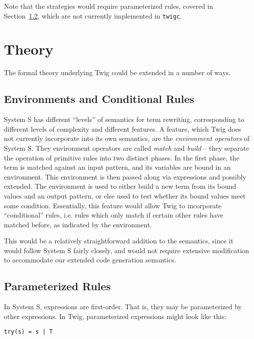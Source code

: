Note that the strategies would require parameterized rules,
covered in Section~\ref{sec:fw:param-rules}, which are not
currently implemented in \texttt{twigc}.

\section{Theory}

The formal theory underlying Twig could be extended in a number of
ways.

\subsection{Environments and Conditional Rules}
\label{sec:fw:env}

System S has different ``levels'' of semantics for term rewriting,
corresponding to different levels of complexity and different
features. A feature, which Twig does not currently incorporate
into its own semantics, are the \emph{environment operators} of
System S. They environment operators are called \emph{match} and
\emph{build} -- they separate the operation of primitive rules
into two distinct phases. In the first phase, the term is matched
against an input pattern, and its variables are bound in an
environment. This environment is then passed along via expressions
and possibly extended. The environment is used to either build a
new term from its bound values and an output pattern, or else used
to test whether its bound values meet some condition. Essentially,
this feature would allow Twig to incorporate ``conditional''
rules, i.e. rules which only match if certain other rules have
matched before, as indicated by the environment.

This would be a relatively straightforward addition to the
semantics, since it would follow System S fairly closely, and
would not require extensive modification to accommodate our
extended code generation semantics.

\subsection{Parameterized Rules}
\label{sec:fw:param-rules}

In System S, expressions are first-order. That is, they may be
parameterized by other expressions. In Twig, parameterized
expressions might look like this:

\begin{verbatim}
try(s) = s | T
\end{verbatim}

